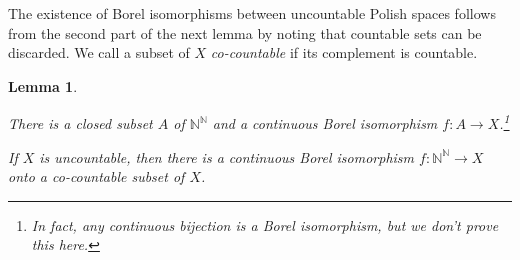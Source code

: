 \documentclass[10pt]{amsart}
\newcommand{\NN}{\mathbb{N}}
\newtheorem{lemma}[theorem]{Lemma}
\theoremstyle{definition}
\theoremstyle{remark}
\newenvironment{enumerate-(1)}{\begin{enumerate}[label={\upshape (\arabic*)}, leftmargin=2pc]}{\end{enumerate}}
\begin{document}
The existence of Borel isomorphisms between uncountable Polish spaces follows from the second part of the next lemma by noting that countable sets can be discarded. 
We call a subset of $X$ \emph{co-countable} if its complement is countable. 

\begin{lemma} \label{Polish space as continuous image} \ 
\begin{enumerate-(1)} 
\item 
There is a closed subset $A$ of $\NN^\NN$ and a continuous Borel isomorphism $f\colon A\rightarrow X$.\footnote{In fact, any continuous bijection is a Borel isomorphism, but we don't prove this here. } 
\item 
If $X$ is uncountable, then there is a continuous Borel isomorphism $f\colon \NN^\NN\rightarrow X$ onto a co-countable subset of $X$. 
\end{enumerate-(1)} 
\end{lemma} 
\end{document}
